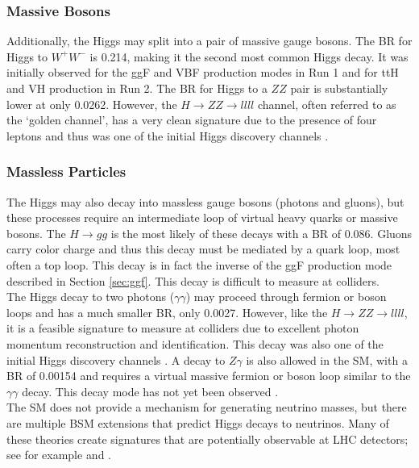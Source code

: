 \subsubsection{Massive Bosons}
Additionally, the Higgs may split into a pair of massive gauge bosons. The BR for Higgs to $W^+W^-$ is 0.214, making it the second most common Higgs decay. It was initially observed for the ggF and VBF production modes in Run 1 \cite{higgs_ww1} and for ttH \cite{tth} and VH \cite{vh_ww} production in Run 2. The BR for Higgs to a $ZZ$ pair is substantially lower at only 0.0262. However, the $H\rightarrow ZZ \rightarrow llll$ channel, often referred to as the `golden channel', has a very clean signature due to the presence of four leptons and thus was one of the initial Higgs discovery channels \cite{higgs_disc_atlas}.

\subsubsection{Massless Particles}
The Higgs may also decay into massless gauge bosons (photons and gluons), but these processes require an intermediate loop of virtual heavy quarks or massive bosons. The $H\rightarrow gg$ is the most likely of these decays with a BR of 0.086. Gluons carry color charge and thus this decay must be mediated by a quark loop, most often a top loop. This decay is in fact the inverse of the ggF production mode described in Section \ref{sec:ggf}. This decay is difficult to measure at colliders.\\ 

The Higgs decay to two photons ($\gamma\gamma$) may proceed through fermion or boson loops and has a much smaller BR, only 0.0027. However, like the $H\rightarrow ZZ \rightarrow llll$, it is a feasible signature to measure at colliders due to excellent photon momentum reconstruction and identification. This decay was also one of the initial Higgs discovery channels \cite{higgs_disc_atlas}. A decay to $Z\gamma$ is also allowed in the SM, with a BR of 0.00154 and requires a virtual massive fermion or boson loop similar to the $\gamma\gamma$ decay. This decay mode has not yet been observed \cite{higgs_zgam}.\\

The SM does not provide a mechanism for generating neutrino masses, but there are multiple BSM extensions that predict Higgs decays to neutrinos. Many of these theories create signatures that are potentially observable at LHC detectors; see for example \cite{higgs_neutrino1} and \cite{higgs_neutrino2}.

